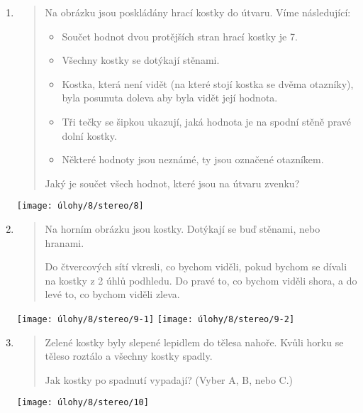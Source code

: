 \begin{enumerate}
    \item
    \begin{minipage}[t]{\linewidth}
        \begin{quote}
            Na obrázku jsou poskládány hrací kostky do útvaru. Víme následující:
            \begin{itemize}
                \item Součet hodnot dvou protějších stran hrací kostky je 7.
                \item Všechny kostky se dotýkají stěnami.
                \item Kostka, která není vidět (na které stojí kostka se dvěma otazníky), byla posunuta doleva aby byla vidět její hodnota.
                \item Tři tečky se šipkou ukazují, jaká hodnota je na spodní stěně pravé dolní kostky.
                \item Některé hodnoty jsou neznámé, ty jsou označené otazníkem.
            \end{itemize}

            Jaký je součet všech hodnot, které jsou na útvaru zvenku?
        \end{quote}
        \centering
        \texttt{[image: úlohy/8/stereo/8]}
    \end{minipage}

    \item
    \begin{minipage}[t]{\linewidth}
        \begin{quote}
            Na horním obrázku jsou kostky. Dotýkají se buď stěnami, nebo hranami.

            Do čtvercových sítí vkresli, co bychom viděli, pokud bychom se dívali na kostky z 2 úhlů podhledu. Do pravé to, co bychom viděli shora, a do levé to, co bychom viděli zleva.
        \end{quote}
        \centering
        \texttt{[image: úlohy/8/stereo/9-1]}
        \texttt{[image: úlohy/8/stereo/9-2]}
    \end{minipage}

    \item
    \begin{minipage}[t]{\linewidth}
        \begin{quote}
            Zelené kostky byly slepené lepidlem do tělesa nahoře. Kvůli horku se těleso roztálo a všechny kostky spadly.

            Jak kostky po spadnutí vypadají? (Vyber A, B, nebo C.)
        \end{quote}
        \centering
        \texttt{[image: úlohy/8/stereo/10]}
    \end{minipage}


\end{enumerate}
